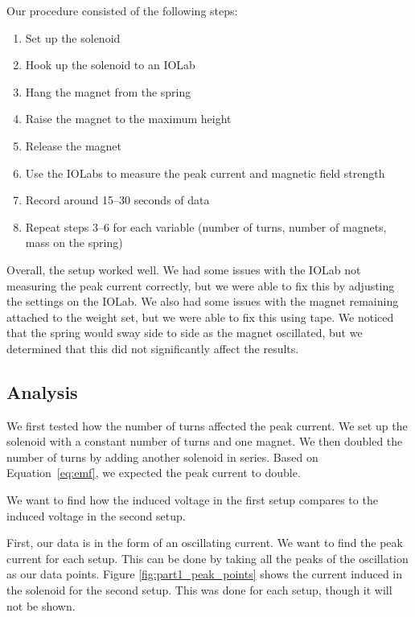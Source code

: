 \documentclass[11pt]{article}
\begin{document}
    Our procedure consisted of the following steps:
    \begin{enumerate}
        \item Set up the solenoid
        \item Hook up the solenoid to an IOLab
        \item Hang the magnet from the spring
        \item Raise the magnet to the maximum height
        \item Release the magnet
        \item Use the IOLabs to measure the peak current and magnetic field strength
        \item Record around 15--30 seconds of data
        \item Repeat steps 3--6 for each variable (number of turns, number of magnets, mass on the spring)
    \end{enumerate}

    Overall, the setup worked well.
    We had some issues with the IOLab not measuring the peak current correctly, but we were able to fix this by adjusting the settings on the IOLab.
    We also had some issues with the magnet remaining attached to the weight set, but we were able to fix this using tape.
    We noticed that the spring would sway side to side as the magnet oscillated, but we determined that this did not significantly affect the results.

    \subsection{Analysis}\label{subsec:part_1_analsysis}

    We first tested how the number of turns affected the peak current.
    We set up the solenoid with a constant number of turns and one magnet.
    We then doubled the number of turns by adding another solenoid in series.
    Based on Equation~\ref{eq:emf}, we expected the peak current to double.

    We want to find how the induced voltage in the first setup compares to the induced voltage in the second setup.

    First, our data is in the form of an oscillating current.
    We want to find the peak current for each setup.
    This can be done by taking all the peaks of the oscillation as our data points.
    Figure \ref{fig:part1_peak_points} shows the current induced in the solenoid for the second setup.
    This was done for each setup, though it will not be shown.
\end{document}
